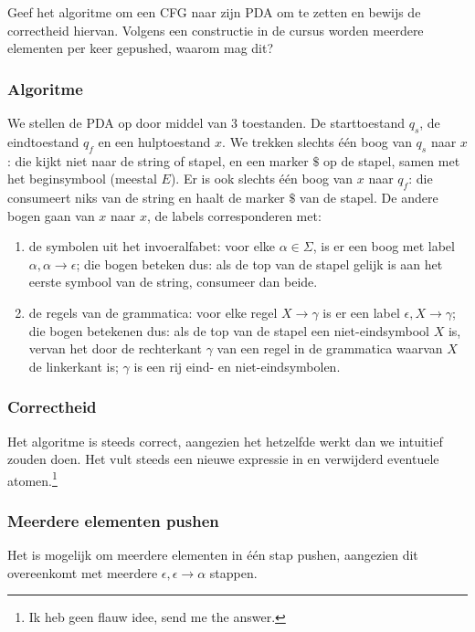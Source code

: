 \begin{question}
Geef het algoritme om een CFG naar zijn PDA om te zetten en bewijs de correctheid hiervan.
Volgens een constructie in de cursus worden meerdere elementen per keer gepushed, waarom mag dit?
\end{question}

\subsubsection*{Algoritme}

We stellen de PDA op door middel van 3 toestanden. De starttoestand $q_s$, de eindtoestand $q_f$ en een hulptoestand $x$. We trekken slechts \'e\'en boog van $q_s$ naar $x$: die kijkt niet naar de string of stapel, en een marker $\$$ op de stapel, samen met het beginsymbool (meestal $E$). Er is ook slechts \'e\'en boog van $x$ naar $q_f$: die consumeert niks van de string en haalt de marker $\$$ van de stapel. De andere bogen gaan van $x$ naar $x$, de labels corresponderen met:
\begin{enumerate}
	\item de symbolen uit het invoeralfabet: voor elke $\alpha \in \Sigma$, is er een boog met label $\alpha, \alpha \rightarrow \epsilon$; die bogen beteken dus: als de top van de stapel gelijk is aan het eerste symbool van de string, consumeer dan beide.
	\item de regels van de grammatica: voor elke regel $X \rightarrow \gamma$ is er een label $\epsilon,X \rightarrow \gamma$; die bogen betekenen dus: als de top van de stapel een niet-eindsymbool $X$ is, vervan het door de rechterkant $\gamma$ van een regel in de grammatica waarvan $X$ de linkerkant is; $\gamma$ is een rij eind- en niet-eindsymbolen.
\end{enumerate}

\subsubsection*{Correctheid}

Het algoritme is steeds correct, aangezien het hetzelfde werkt dan we intuitief zouden doen. Het vult steeds een nieuwe expressie in en verwijderd eventuele atomen.\footnote{Ik heb geen flauw idee, send me the answer.}

\subsubsection*{Meerdere elementen pushen}

Het is mogelijk om meerdere elementen in \'e\'en stap pushen, aangezien dit overeenkomt met meerdere $\epsilon, \epsilon \rightarrow \alpha$ stappen.